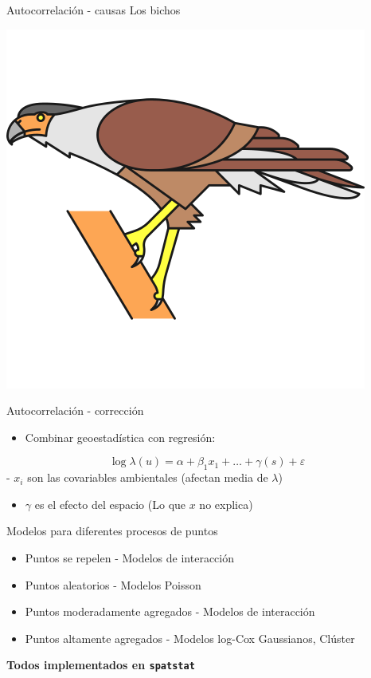 \documentclass[
  11pt,
  ignorenonframetext,
]{beamer}
\providecommand{\tightlist}{%
  \setlength{\itemsep}{0pt}\setlength{\parskip}{0pt}}
\begin{document}
\begin{frame}{Autocorrelación - causas}
\protect\hypertarget{autocorrelaciuxf3n---causas-1}{}
Los bichos

\begin{center}\includegraphics{Figuras/Bicho} \end{center}
\end{frame}

\begin{frame}{Autocorrelación - corrección}
\protect\hypertarget{autocorrelaciuxf3n---correcciuxf3n}{}
\begin{itemize}
\tightlist
\item
  Combinar geoestadística con regresión:
\end{itemize}

\[ \log \lambda(u) = \alpha + \beta_1 x_1 + \dots + \gamma(s) + \varepsilon \]
- \(x_i\) son las covariables ambientales (afectan media de \(\lambda\))

\begin{itemize}
\tightlist
\item
  \(\gamma\) es el efecto del espacio (Lo que \(x\) no explica)
\end{itemize}
\end{frame}

\begin{frame}[fragile]{Modelos para diferentes procesos de puntos}
\protect\hypertarget{modelos-para-diferentes-procesos-de-puntos}{}
\begin{itemize}
\item
  Puntos se repelen - Modelos de interacción
\item
  Puntos aleatorios - Modelos Poisson
\item
  Puntos moderadamente agregados - Modelos de interacción
\item
  Puntos altamente agregados - Modelos log-Cox Gaussianos, Clúster
\end{itemize}

\textbf{Todos implementados en \texttt{spatstat}}
\end{frame}
\end{document}
